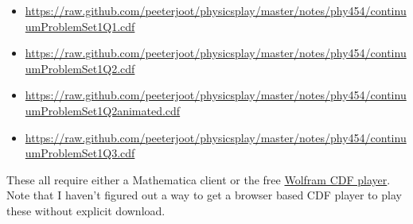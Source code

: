 \begin{itemize}
\item 
\href{https://raw.github.com/peeterjoot/physicsplay/master/notes/phy454/continuumProblemSet1Q1.cdf}{https://raw.github.com/peeterjoot/physicsplay/master/notes/phy454/continuumProblemSet1Q1.cdf}
\item 
\href{https://raw.github.com/peeterjoot/physicsplay/master/notes/phy454/continuumProblemSet1Q2.cdf}{https://raw.github.com/peeterjoot/physicsplay/master/notes/phy454/continuumProblemSet1Q2.cdf}
\item 
\href{https://raw.github.com/peeterjoot/physicsplay/master/notes/phy454/continuumProblemSet1Q2animated.cdf}{https://raw.github.com/peeterjoot/physicsplay/master/notes/phy454/continuumProblemSet1Q2animated.cdf}
\item 
\href{https://raw.github.com/peeterjoot/physicsplay/master/notes/phy454/continuumProblemSet1Q3.cdf}{https://raw.github.com/peeterjoot/physicsplay/master/notes/phy454/continuumProblemSet1Q3.cdf}
\end{itemize}

These all require either a Mathematica client or the free \href{http://www.wolfram.com/cdf-player/}{Wolfram CDF player}.  Note that I haven't figured out a way to get a browser based CDF player to play these without explicit download.

\EndArticle
